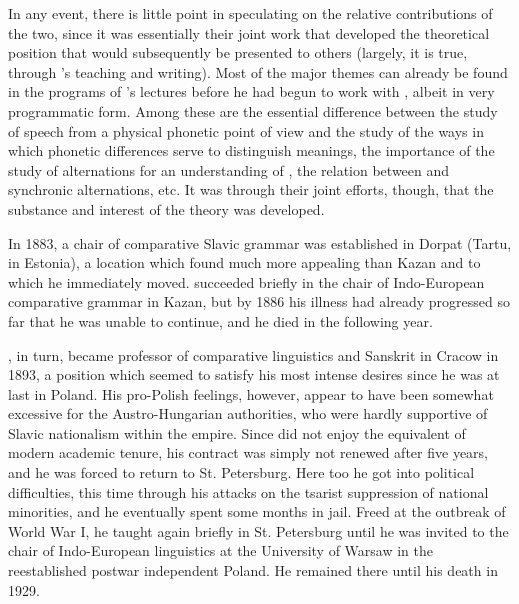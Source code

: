 In any event, there is little point in speculating on the relative
contributions of the two, since it was essentially their joint work
that developed the theoretical position that would subsequently be
presented to others (largely, it is true, through {\Baudouin}'s teaching
and writing). Most of the major themes can already be found in the
programs of {\Baudouin}'s lectures before he had begun to work with
{\Kruszewski}, albeit in very programmatic form. Among these are the
essential difference between the study of speech from a physical
phonetic point of view and the study of the ways in which phonetic
differences serve to distinguish meanings, the importance of the study
of alternations for an understanding of , the relation
between  and synchronic alternations, etc. It was through
their joint efforts, though, that the substance and interest of the
theory was developed.

In 1883, a chair of comparative Slavic grammar was established in
Dorpat (Tartu, in Estonia), a location which {\Baudouin} found much more
appealing than Kazan and to which he immediately moved. {\Kruszewski}
succeeded {\Baudouin} briefly in the chair of {Indo-European} comparative
grammar in Kazan, but by 1886 his illness had already progressed so
far that he was unable to continue, and he died in the following year.

{\Baudouin}, in turn, became professor of comparative linguistics and
{Sanskrit} in Cracow in 1893, a position which seemed to satisfy his
most intense desires since he was at last in Poland. His pro-Polish
feelings, however, appear to have been somewhat excessive for the
Austro-{Hungarian} authorities, who were hardly supportive of Slavic
nationalism within the empire. Since {\Baudouin} did not enjoy the
equivalent of modern academic tenure, his contract was simply not
renewed after five years, and he was forced to return to
St. Petersburg. Here too he got into political difficulties, this time
through his attacks on the tsarist suppression of national minorities,
and he eventually spent some months in jail. Freed at the outbreak of
World War I, he taught again briefly in St. Petersburg until he was
invited to the chair of {Indo-European} linguistics at the University of
Warsaw in the reestablished postwar independent Poland. He remained
there until his death in 1929.

